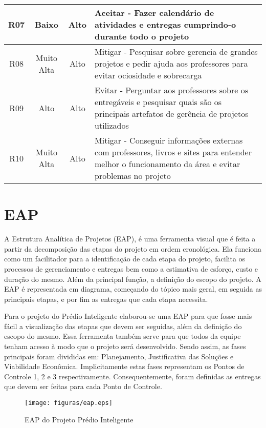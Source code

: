 \begin{table}[!h]
\begin{tabular}{|c|c|c|l|}
    R07                    & Baixo                  & Alto             & \parbox[t]{5cm}{Aceitar - Fazer calendário de atividades e entregas cumprindo-o durante todo o projeto}                                                                                   \\ \hline
    R08                    & Muito Alta             & Alto             & \parbox[t]{5cm}{Mitigar - Pesquisar sobre gerencia de grandes projetos e pedir ajuda aos professores para evitar ociosidade e sobrecarga}                                                 \\ \hline
    R09                    & Alto                   & Alto             & \parbox[t]{5cm}{Evitar - Perguntar aos professores sobre os entregáveis e pesquisar quais são os principais artefatos de gerência de projetos utilizados}                                 \\ \hline
    R10                    & Muito Alta             & Alto             & \parbox[t]{5cm}{Mitigar - Conseguir informações externas com professores, livros e sites para entender melhor o funcionamento da área e evitar problemas no projeto} \\ \hline
  \end{tabular}
\end{table}

\chapter{EAP}
A Estrutura Analítica de Projetos (EAP), é uma ferramenta visual que é feita a partir da decomposição das etapas do projeto em ordem cronológica. Ela funciona como um facilitador para a identificação de cada etapa do projeto, facilita os processos de gerenciamento e entregas bem como a estimativa de esforço, custo e duração do mesmo. Além da principal função, a definição do escopo do projeto. A EAP é representada em diagrama, começando do tópico mais geral, em seguida as principais etapas, e por fim as entregas que cada etapa necessita.

Para o projeto do Prédio Inteligente elaborou-se uma EAP para que fosse mais fácil a visualização das etapas que devem ser seguidas, além da definição do escopo do mesmo. Essa ferramenta também serve para que todos da equipe tenham acesso à modo que o projeto será desenvolvido. Sendo assim, as fases principais foram divididas em: Planejamento, Justificativa das Soluções e Viabilidade Econômica. Implicitamente estas fases representam os Pontos de Controle 1, 2 e 3 respectivamente. Consequentemente, foram definidas as entregas que devem ser feitas para cada Ponto de Controle.
 \begin{figure}[!h]
 	\centering
 	\texttt{[image: figuras/eap.eps]}
 	\caption{EAP do Projeto Prédio Inteligente}
 	\label{fig01}
 \end{figure}

